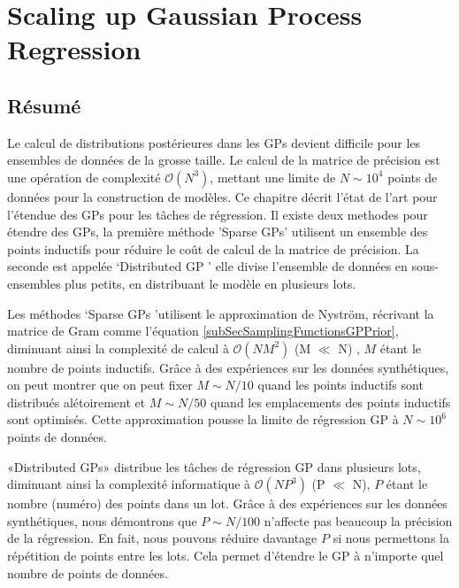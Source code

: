 \chapter{Scaling up Gaussian Process Regression}
\label{chapScalingGPR}


\begin{mdframed}[hidealllines=true,backgroundcolor=lightgray!20]
\section*{Résumé}
Le calcul de distributions postérieures dans les GPs devient difficile pour les ensembles de données de la grosse taille. Le calcul de la matrice de précision est une opération de complexité $ \mathcal{O}(N ^ {3}) $, mettant une limite de $ N \sim 10^4 $ points de données pour la construction de modèles. Ce chapitre décrit l'état de l'art pour l'étendue des GPs pour les tâches de régression. Il existe deux methodes pour étendre des GPs, la première méthode 'Sparse GPs' utilisent un ensemble des points inductifs pour réduire le coût de calcul de la matrice de précision. La seconde est appelée `Distributed GP ' elle divise l'ensemble de données en sous-ensembles plus petits, en distribuant le modèle en plusieurs lots.

Les méthodes `Sparse GPs 'utilisent le approximation de Nystr\"{o}m, récrivant la matrice de Gram comme l'équation \ref{subSecSamplingFunctionsGPPrior}, diminuant ainsi la complexité de calcul à $ \mathcal{O} (NM^{2}) $ (M $ \ll $ N) , $ M $ étant le nombre de points inductifs. Grâce à des expériences sur les données synthétiques, on peut montrer que on peut fixer $ M \sim N/10 $ quand les points inductifs sont distribués alétoirement et $ M \sim N/50 $ quand les emplacements des points inductifs sont optimisés. Cette approximation pousse la limite de régression GP à $ N \sim 10^6 $ points de données.

«Distributed GPs» distribue les tâches de régression GP dans plusieurs lots, diminuant ainsi la complexité informatique à $ \mathcal{O} (NP^{3}) $ (P $\ll$ N), $ P $ étant le nombre (numéro) des points dans un lot. Grâce à des expériences sur les données synthétiques, nous démontrons que $ P \sim N/100 $ n'affecte pas beaucoup la précision de la régression. En fait, nous pouvons réduire davantage $ P $ si nous permettons la répétition de points entre les lots. Cela permet d'étendre le GP à n'importe quel nombre de points de données.
\end{mdframed}


